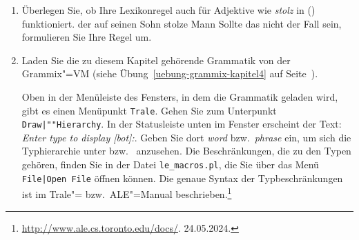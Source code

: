 {\begin{enumerate}
\item Überlegen Sie, ob Ihre Lexikonregel auch für Adjektive wie \emph{stolz} in ()
  funktioniert.
\ea
der auf seinen Sohn stolze Mann
\z
Sollte das nicht der Fall sein, formulieren Sie Ihre Regel um.

\item Laden Sie die zu diesem Kapitel gehörende Grammatik von der Grammix"=VM
(siehe Übung~\ref{uebung-grammix-kapitel4} auf Seite~\pageref{uebung-grammix-kapitel4}).

Oben in der Menüleiste des Fensters, in dem die Grammatik geladen wird, gibt es einen Menüpunkt \texttt{Trale}.
Gehen Sie zum  Unterpunkt \texttt{Draw|""Hierarchy}. 
In der Statusleiste unten im Fenster erscheint der Text: \emph{Enter type to display [bot]:}.
Geben Sie dort \emph{word} bzw.\ \emph{phrase} ein, um sich die Typhierarchie unter
 bzw.\  anzusehen. Die Beschränkungen, die zu den Typen gehören, finden
Sie in der Datei \texttt{le\_macros.pl}, die Sie über das Menü \texttt{File|Open File} öffnen können.
Die genaue Syntax der Typbeschränkungen ist im Trale"= bzw.\ ALE"=Manual beschrieben.\footnote{
\url{http://www.ale.cs.toronto.edu/docs/}. 24.05.2024.%
}
\end{enumerate}
}




